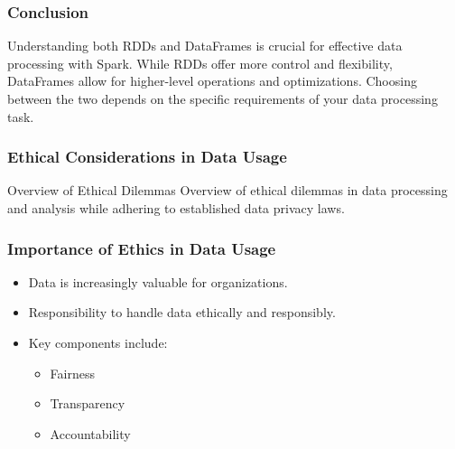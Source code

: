 \documentclass[aspectratio=169]{beamer}
\begin{document}
\begin{frame}
    \frametitle{Conclusion}
    Understanding both RDDs and DataFrames is crucial for effective data processing with Spark. While RDDs offer more control and flexibility, DataFrames allow for higher-level operations and optimizations. 
    Choosing between the two depends on the specific requirements of your data processing task.
\end{frame}

\begin{frame}[fragile]
    \frametitle{Ethical Considerations in Data Usage}
    \begin{block}{Overview of Ethical Dilemmas}
        Overview of ethical dilemmas in data processing and analysis while adhering to established data privacy laws.
    \end{block}
\end{frame}

\begin{frame}[fragile]
    \frametitle{Importance of Ethics in Data Usage}
    \begin{itemize}
        \item Data is increasingly valuable for organizations.
        \item Responsibility to handle data ethically and responsibly.
        \item Key components include:
        \begin{itemize}
            \item Fairness
            \item Transparency
            \item Accountability
        \end{itemize}
    \end{itemize}
\end{frame}
\end{document}
